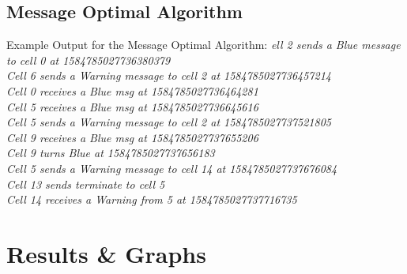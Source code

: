 \documentclass[a4paper,12pt]{report}
\begin{document}
\subsection{Message Optimal Algorithm}
Example Output for the Message Optimal Algorithm:
\textit{ell 2 sends a Blue message to cell 0 at 1584785027736380379\\
Cell 6 sends a Warning message to cell 2 at 1584785027736457214\\
Cell 0 receives a Blue msg at 1584785027736464281\\
Cell 5 receives a Blue msg at 1584785027736645616\\
Cell 5 sends a Warning message to cell 2 at 1584785027737521805\\
Cell 9 receives a Blue msg at 1584785027737655206\\
Cell 9 turns Blue at 1584785027737656183\\
Cell 5 sends a Warning message to cell 14 at 1584785027737676084\\
Cell 13 sends terminate to cell 5\\
Cell 14 receives a Warning from 5 at 1584785027737716735\\}
\newpage
\section{Results \& Graphs}
\end{document}
